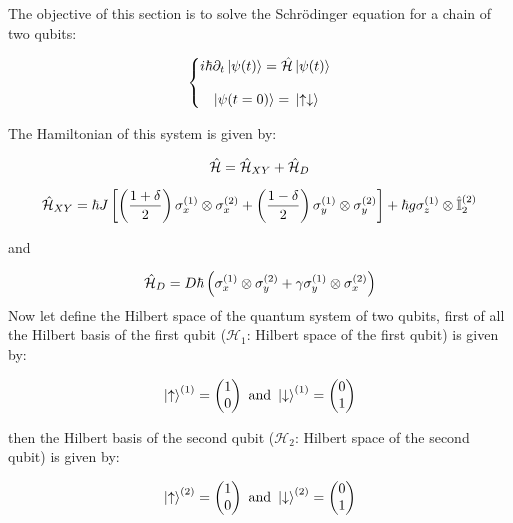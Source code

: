 The objective of this section is to solve the Schrödinger equation for a chain of two qubits:

\[ 	\left\{\begin{matrix}
		i \hbar \partial_t \ket{\psi(t)} = \hat{\mathcal{H}}\ket{\psi(t)}  \\
		 \\
		 \ket*{\psi (t=0)} = \ket*{\uparrow \downarrow}
	   \end{matrix}\right.\]



The Hamiltonian of this system is given by:

\begin{equation}\label{eq: Hamiltionian model XY-Gamma 2 qubits}
	\hat{\mathcal{H}} =  \hat{\mathcal{H}}_{XY} + \hat{\mathcal{H}}_{D}
\end{equation}

\begin{equation}\label{eq: Hamiltionian model XY 2 qubits}
	\hat{\mathcal{H}}_{XY} = \hbar J\left [ \left ( \frac{1 + \delta}{2} \right ) \sigma_x^{(1)} \otimes \sigma_x^{(2)} 
	+ \left ( \frac{1 - \delta}{2} \right ) \sigma_y^{(1)} \otimes \sigma_y^{(2)} \right ] 
	+ \hbar g \sigma_z^{(1)} \otimes \hat{\mathbb{I}}_{2}^{(2)}
\end{equation}

and 

\begin{equation}\label{eq: Hamiltionian model Gamma 2 qubits}
	\hat{\mathcal{H}}_{D} = D \hbar \left ( \sigma_x^{(1)} \otimes \sigma_y^{(2)} + \gamma \sigma_y^{(1)} \otimes \sigma_x^{(2)} \right ) 
\end{equation}
Now let define the Hilbert space of the quantum system of 
two qubits, first of all the Hilbert 
basis of the first qubit ($\mathcal{H}_1$: 
Hilbert space of the first qubit) is given by:

\[ \ket{\uparrow}^{(1)} =  \begin{pmatrix} 1 \\0 \end{pmatrix} \ \text{and} \ \ket{\downarrow}^{(1)} =  \begin{pmatrix} 0 \\1 \end{pmatrix} \]

then the Hilbert basis of the second qubit ($\mathcal{H}_2$: Hilbert space of the second qubit) is given by:

\[ \ket{\uparrow}^{(2)} =  \begin{pmatrix} 1 \\0 \end{pmatrix} \ \text{and} \ \ket{\downarrow}^{(2)} =  \begin{pmatrix} 0 \\1 \end{pmatrix} \]

